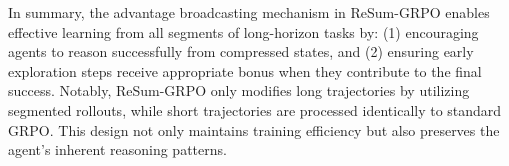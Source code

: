 In summary, the advantage broadcasting mechanism in ReSum-GRPO enables effective learning from all segments of long-horizon tasks by: (1) encouraging agents to reason successfully from compressed states, and (2) ensuring early exploration steps receive appropriate bonus when they contribute to the final success. Notably, ReSum-GRPO only modifies long trajectories by utilizing segmented rollouts, while short trajectories are processed identically to standard GRPO. This design not only maintains training efficiency but also preserves the agent’s inherent reasoning patterns.
